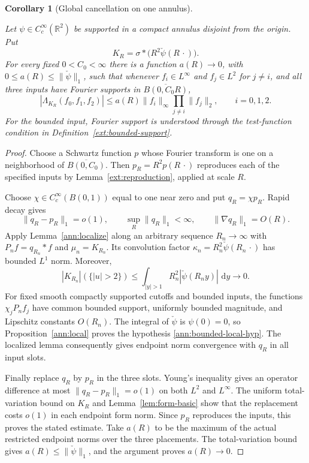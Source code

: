 \documentclass[11pt]{amsart}
\newcommand{\R}{\mathbb R}
\newcommand{\dd}{\,\mathrm d}
\newtheorem{corollary}[theorem]{Corollary}
\theoremstyle{definition}
\theoremstyle{remark}
\numberwithin{equation}{section}
\providecommand{\lean}[1]{}
\providecommand{\leanok}{}
\begin{document}
\begin{corollary}[Global cancellation on one annulus]\label{ann:global}
\lean{Auto.ann_global}
\leanok
Let $\psi\in C_c^\infty(\R^2)$ be supported in a compact
annulus disjoint from the origin. Put
\[
 K_R=\sigma*\bigl(R^2\check\psi(R\,\cdot)\bigr).
\]
For every fixed $0<C_0<\infty$ there is a function $a(R)\to0$,
with $0\le a(R)\le\|\check\psi\|_1$, such that whenever
$f_i\in L^\infty$ and $f_j\in L^2$ for $j\ne i$, and all three
inputs have Fourier supports in $\overline{B(0,C_0R)}$,
\[
 |\Lambda_{K_R}(f_0,f_1,f_2)|
 \le a(R)\|f_i\|_\infty\prod_{j\ne i}\|f_j\|_2,
 \qquad i=0,1,2.
\]
For the bounded input, Fourier support is understood through the
test-function condition in Definition~\ref{ext:bounded-support}.
\end{corollary}
\begin{proof}
Choose a Schwartz function $p$ whose Fourier transform is one
on a neighborhood of $\overline{B(0,C_0)}$. Then
$p_R=R^2p(R\,\cdot)$ reproduces each of the specified inputs
by Lemma~\ref{ext:reproduction}, applied at scale $R$.

Choose $\chi\in C_c^\infty(B(0,1))$ equal to one near zero and
put $q_R=\chi p_R$. Rapid decay gives
\[
 \|q_R-p_R\|_1=o(1),\qquad
 \sup_R\|q_R\|_1<\infty,\qquad
 \|\nabla q_R\|_1=O(R).
\]
Apply Lemma~\ref{ann:localize} along an arbitrary sequence
$R_n\to\infty$ with $P_nf=q_{R_n}*f$ and
$\mu_n=K_{R_n}$. Its convolution factor
$\kappa_n=R_n^2\check\psi(R_n\,\cdot)$ has bounded $L^1$ norm.
Moreover,
\[
 |K_{R_n}|(\{|u|>2\})
 \le\int_{|y|>1}R_n^2|\check\psi(R_ny)|\,\dd y
 \longrightarrow0.
\]
For fixed smooth compactly supported cutoffs and bounded inputs,
the functions $\chi_jP_nf_j$ have common bounded support,
uniformly bounded magnitude, and Lipschitz constants $O(R_n)$.
The integral of $\check\psi$ is $\psi(0)=0$, so
Proposition~\ref{ann:local} proves the hypothesis
\eqref{ann:bounded-local-hyp}. The localized lemma consequently
gives endpoint norm convergence with $q_R$ in all input slots.

Finally replace $q_R$ by $p_R$ in the three slots. Young's
inequality gives an operator difference at most
$\|q_R-p_R\|_1=o(1)$ on both $L^2$ and $L^\infty$.
The uniform total-variation bound on $K_R$ and
Lemma~\ref{lem:form-basic} show that the replacement costs
$o(1)$ in each endpoint form norm. Since $p_R$ reproduces the
inputs, this proves the stated estimate. Take $a(R)$ to be the
maximum of the actual restricted endpoint norms over the three
placements. The total-variation bound gives
$a(R)\le\|\check\psi\|_1$, and the argument proves $a(R)\to0$.
\end{proof}
\end{document}
